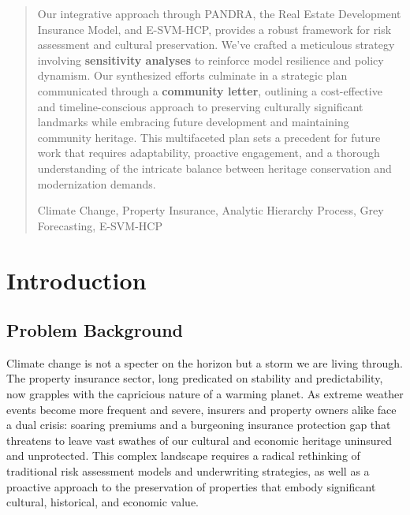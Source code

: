 \documentclass{mcmthesis}
\renewcommand{\contentsname}{\hspace*{\fill}\Large\bfseries Contents \hspace*{\fill}}
\begin{document}
\begin{abstract}
    Our integrative approach through PANDRA, the Real Estate Development Insurance Model, and E-SVM-HCP, provides a robust framework for risk assessment and cultural preservation. We've crafted a meticulous strategy involving \textbf{sensitivity analyses} to reinforce model resilience and policy dynamism. Our synthesized efforts culminate in a strategic plan communicated through a \textbf{community letter}, outlining a cost-effective and timeline-conscious approach to preserving culturally significant landmarks while embracing future development and maintaining community heritage. This multifaceted plan sets a precedent for future work that requires adaptability, proactive engagement, and a thorough understanding of the intricate balance between heritage conservation and modernization demands.
    
    \begin{keywords}
        Climate Change, Property Insurance, Analytic Hierarchy Process, Grey Forecasting, E-SVM-HCP
    \end{keywords}

\end{abstract}

\maketitle

\tableofcontents        %
\thispagestyle{empty}

\newpage

\section{Introduction}

\subsection{Problem Background}

Climate change is not a specter on the horizon but a storm we are living through. The property insurance sector, long predicated on stability and predictability, now grapples with the capricious nature of a warming planet. As extreme weather events become more frequent and severe, insurers and property owners alike face a dual crisis: soaring premiums and a burgeoning insurance protection gap that threatens to leave vast swathes of our cultural and economic heritage uninsured and unprotected. This complex landscape requires a radical rethinking of traditional risk assessment models and underwriting strategies, as well as a proactive approach to the preservation of properties that embody significant cultural, historical, and economic value.
\end{document}
